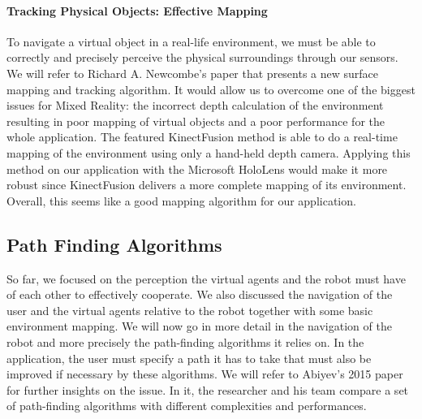 \paragraph{Tracking Physical Objects: Effective Mapping}
To navigate a virtual object in a real-life environment, we must be able to correctly and precisely perceive the physical surroundings through our sensors. We will refer to Richard A. Newcombe's paper\cite{newcombe2011kinectfusion} that presents a new surface mapping and tracking algorithm. It would allow us to overcome one of the biggest issues for Mixed Reality\cite{kruijff2010perceptual}: the incorrect depth calculation of the environment resulting in poor mapping of virtual objects and a poor performance for the whole application. \newline 
The featured KinectFusion method is able to do a real-time mapping of the environment using only a hand-held depth camera. Applying this method on our application with the Microsoft HoloLens would make it more robust since KinectFusion delivers a more complete mapping of its environment. Overall, this seems like a good mapping algorithm for our application. 

\subsection{Path Finding Algorithms}
So far, we focused on the perception the virtual agents and the robot must have of each other to effectively cooperate. We also discussed the navigation of the user and the virtual agents relative to the robot together with some basic environment mapping.
\newline
We will now go in more detail in the navigation of the robot and more precisely the path-finding algorithms it relies on. In the application, the user must specify a path it has to take that must also be improved if necessary by these algorithms. 
\newline
We will refer to Abiyev's 2015 paper\cite{abiyev2015improved} for further insights on the issue. In it, the researcher and his team compare a set of path-finding algorithms with different complexities and performances.

